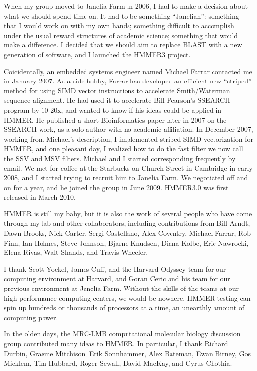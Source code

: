 When my group moved to Janelia Farm in 2006, I had to make a decision
about what we should spend time on. It had to be something
``Janelian'': something that I would work on with my own hands;
something difficult to accomplish under the usual reward structures of
academic science; something that would make a difference. I decided
that we should aim to replace BLAST with a new generation of software,
and I launched the HMMER3 project.

Coicidentally, an embedded systems engineer named Michael Farrar
contacted me in January 2007. As a side hobby, Farrar has developed an
efficient new ``striped'' method for using SIMD vector instructions to
accelerate Smith/Waterman sequence alignment. He had used it to
accelerate Bill Pearson's SSEARCH program by 10-20x, and wanted to
know if his ideas could be applied in HMMER. He published a short
Bioinformatics paper later in 2007 on the SSEARCH work, as a solo
author with no academic affiliation. In December 2007, working from
Michael's description, I implemented striped SIMD vectorization for
HMMER, and one pleasant day, I realized how to do the fast filter we
now call the SSV and MSV filters. Michael and I started corresponding
frequently by email. We met for coffee at the Starbucks on Church
Street in Cambridge in early 2008, and I started trying to recruit him
to Janelia Farm. We negotiated off and on for a year, and he joined
the group in June 2009. HMMER3.0 was first released in March 2010.

HMMER is still my baby, but it is also the work of several people who
have come through my lab and other collaborators, including
contributions from Bill Arndt, Dawn Brooks, Nick Carter, Sergi
Castellano, Alex Coventry, Michael Farrar, Rob Finn, Ian Holmes, Steve
Johnson, Bjarne Knudsen, Diana Kolbe, Eric Nawrocki, Elena Rivas, Walt
Shands, and Travis Wheeler.

I thank Scott Yockel, James Cuff, and the Harvard Odyssey team for our
computing environment at Harvard, and Goran Ceric and his team for our
previous environment at Janelia Farm.  Without the skills of the teams
at our high-performance computing centers, we would be nowhere. HMMER
testing can spin up hundreds or thousands of processors at a time, an
unearthly amount of computing power.

In the olden days, the MRC-LMB computational molecular biology
discussion group contributed many ideas to HMMER. In particular, I
thank Richard Durbin, Graeme Mitchison, Erik Sonnhammer, Alex Bateman,
Ewan Birney, Gos Micklem, Tim Hubbard, Roger Sewall, David MacKay, and
Cyrus Chothia.

